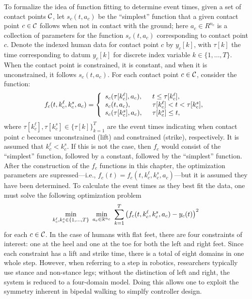 To formalize the idea of function fitting to determine event times, given a set
of contact points $\mathcal{C}$, let $s_{c}(t, a_{c})$ be the ``simplest'' function that
a given contact point $c \in \mathcal{C}$ follows when not in contact with the ground;
%
here $a_{c} \in R^{n_{c}}$ is a collection of parameters for the function
$s_{c}(t, a_{c})$ corresponding to contact point $c$.
%
Denote the indexed human data for contact point $c$ by $y_{c}[k]$, with
$\tau[k]$ the time corresponding to datum $y_{c}[k]$ for discrete index variable
$k \in \{1,\ldots,T\}$.
%
When the contact point is constrained, it is constant, and when it is
unconstrained, it follows $s_{c}(t, a_{c})$.
%
For each contact point $c \in \mathcal{C}$, consider the function:
%
\begin{align*}
  f_{c}(t, k_{c}^{\ell}, k_{c}^{s}, a_{c}) =  \left\{\begin{array}{l l}
      s_{c}(\tau[k_{c}^{\ell}], a_{c}), & \hspace{2mm} t \leq
      \tau[k_{c}^{\ell}],\\
      s_{c}(t, a_{c}), & \hspace{2mm} \tau[k_{c}^{\ell}] < t <
      \tau[k_{c}^{s}],\\
      s_{c}(\tau[k_{c}^{s}], a_{c}), & \hspace{2mm} \tau[k_{c}^{s}] \leq t,\\
  \end{array} \right.
\end{align*}
where $\tau[k_{c}^{\ell}], \tau[k_{c}^{s}] \in \{\tau[k]\}_{k = 1}^{T}$ are the
event times indicating when contact point $c$ becomes unconstrained (lift) and
constrained (strike), respectively.
%
It is assumed that $k_{c}^{\ell} < k_{c}^{s}$.
%
If this is not the case, then $f_{c}$ would consist of the ``simplest''
function, followed by a constant, followed by the ``simplest'' function.
%
After the construction of the $f_{c}$ functions in this chapter, the optimization
parameters are supressed---i.e., $f_{c}(t) = f_{c}(t, k_{c}^{\ell}, k_{c}^{s},
a_{c})$---but it is assumed they have been determined.
%
To calculate the event times as they best fit the data, one must solve the
following optimization problem
\begin{align*}
  \min_{k_{c}^{\ell}, k_{c}^{s} \in \{1, \ldots, T\}} \ \min_{a_{c} \in
    \mathbb{R}^{n_{c}}} \ \sum_{k = 1}^{T} \left( f_{c}(t, k_{c}^{\ell}, k_{c}^{s},
    a_{c}) - y_{c}(t) \right)^2
\end{align*}
for each $c \in \mathcal{C}$.
%
In the case of humans with flat feet, there are four constraints of interest:
%
one at the heel and one at the toe for both the left and right feet.
%
Since each constraint has a lift and strike time, there is a total of eight
domains in one whole step.
%
However, when referring to a step in robotics, researchers typically use stance
and non-stance legs;
%
without the distinction of left and right, the system is reduced to a
four-domain model.
%
Doing this allows one to exploit the symmetry inherent in bipedal walking to
simplfy controller design.

